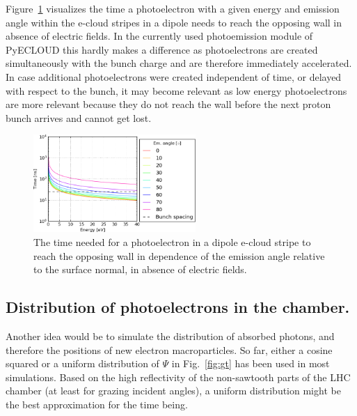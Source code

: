 Figure~\ref{fig:time} visualizes the time a photoelectron with a given energy and emission angle within the e-cloud stripes in a dipole needs to reach the opposing wall in absence of electric fields.
In the currently used photoemission module of PyECLOUD this hardly makes a difference as photoelectrons are created simultaneously with the bunch charge and are therefore immediately accelerated.
In case additional photoelectrons were created independent of time, or delayed with respect to the bunch, it may become relevant as low energy photoelectrons are more relevant because they do not reach the wall before the next proton bunch arrives and cannot get lost.

\begin{figure}[tbh]
    \centering
    \includegraphics[width=0.55\textwidth]{../plots/time.png}
    \caption{The time needed for a photoelectron in a dipole e-cloud stripe to reach the opposing wall in dependence of the emission angle relative to the surface normal, in absence of electric fields.}
    \label{fig:time}
\end{figure}



\subsection{Distribution of photoelectrons in the chamber.}

Another idea would be to simulate the distribution of absorbed photons, and therefore the positions of new electron macroparticles.
So far, either a cosine squared or a uniform distribution of $\Psi$ in Fig.~\ref{fig:gt} has been used in most simulations.
Based on the high reflectivity of the non-sawtooth parts of the LHC chamber (at least for grazing incident angles), a uniform distribution might be the best approximation for the time being.



